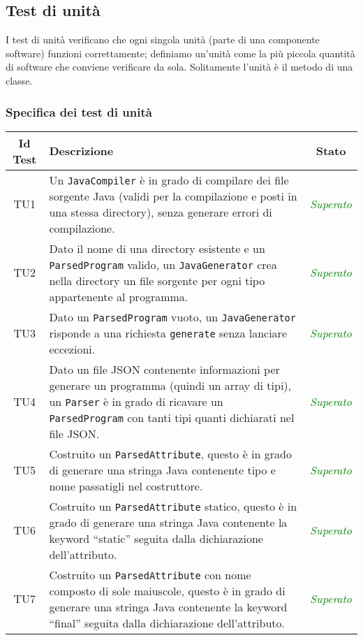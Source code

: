 \subsection{Test di unità}
I test di unità verificano che ogni singola unità (parte di una componente software) funzioni correttamente; definiamo un'unità come la più piccola quantità di software che conviene verificare da sola. Solitamente l'unità è il metodo di una classe.

\subsubsection{Specifica dei test di unità} \label{sec:spec_tu}
\normalsize
\begin{longtable}{|c|>{}m{8cm}|c|}
\hline 
\textbf{Id Test} & \textbf{Descrizione} & \textbf{Stato}\\
\hline
\endhead
\hypertarget{TU1}{TU1} & Un \texttt{JavaCompiler} è in grado di compilare dei file sorgente Java (validi per la compilazione e posti in una stessa directory), senza generare errori di compilazione. & \textcolor{Green}{\textit{Superato}}\\ \hline
\hypertarget{TU2}{TU2} & Dato il nome di una directory esistente e un \texttt{ParsedProgram} valido, un \texttt{JavaGenerator} crea nella directory un file sorgente per ogni tipo appartenente al programma. & \textcolor{Green}{\textit{Superato}}\\ \hline
\hypertarget{TU3}{TU3} & Dato un \texttt{ParsedProgram} vuoto, un \texttt{JavaGenerator} risponde a una richiesta \texttt{generate} senza lanciare eccezioni. & \textcolor{Green}{\textit{Superato}}\\ \hline
\hypertarget{TU4}{TU4} & Dato un file JSON contenente informazioni per generare un programma (quindi un array di tipi), un \texttt{Parser} è in grado di ricavare un \texttt{ParsedProgram} con tanti tipi quanti dichiarati nel file JSON. & \textcolor{Green}{\textit{Superato}}\\ \hline
\hypertarget{TU5}{TU5} & Costruito un \texttt{ParsedAttribute}, questo è in grado di generare una stringa Java contenente tipo e nome passatigli nel costruttore. & \textcolor{Green}{\textit{Superato}}\\ \hline
\hypertarget{TU6}{TU6} & Costruito un \texttt{ParsedAttribute} statico, questo è in grado di generare una stringa Java contenente la keyword ``static'' seguita dalla dichiarazione dell'attributo. & \textcolor{Green}{\textit{Superato}}\\ \hline
\hypertarget{TU7}{TU7} & Costruito un \texttt{ParsedAttribute} con nome composto di sole maiuscole, questo è in grado di generare una stringa Java contenente la keyword ``final'' seguita dalla dichiarazione dell'attributo. & \textcolor{Green}{\textit{Superato}}\\ \hline

\end{longtable}
